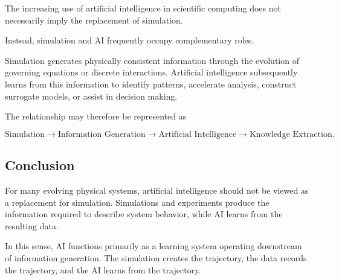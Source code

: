 \documentclass[11pt]{article}
\begin{document}
The increasing use of artificial intelligence in scientific computing
does not necessarily imply the replacement of simulation.

Instead, simulation and AI frequently occupy complementary roles.

Simulation generates physically consistent information through the
evolution of governing equations or discrete interactions. Artificial
intelligence subsequently learns from this information to identify
patterns, accelerate analysis, construct surrogate models, or assist in
decision making.

The relationship may therefore be represented as

\begin{equation}
\text{Simulation}
\rightarrow
\text{Information Generation}
\rightarrow
\text{Artificial Intelligence}
\rightarrow
\text{Knowledge Extraction}.
\end{equation}

\subsection{Conclusion}

For many evolving physical systems, artificial intelligence should not
be viewed as a replacement for simulation. Simulations and experiments
produce the information required to describe system behavior, while AI
learns from the resulting data.

In this sense, AI functions primarily as a learning system operating
downstream of information generation. The simulation creates the
trajectory, the data records the trajectory, and the AI learns from the
trajectory.
\end{document}
